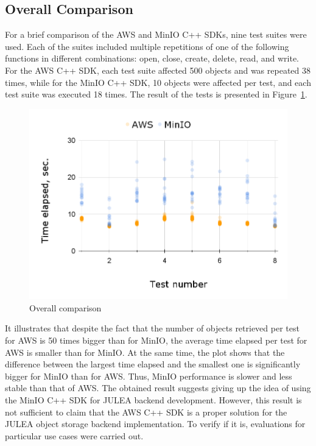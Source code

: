 \documentclass[conference]{IEEEtran}
\begin{document}
\subsection{Overall Comparison}
For a brief comparison of the AWS and MinIO C++ SDKs, nine test suites were used. Each of the suites included multiple repetitions of one of the following functions in different combinations: open, close, create, delete, read, and write. For the AWS C++ SDK, each test suite affected 500 objects and was repeated 38 times, while for the MinIO C++ SDK, 10 objects were affected per test, and each test suite was executed 18 times. The result of the tests is presented in Figure~\ref{fig:overall-comparison}. 
\begin{figure}
    \centering
    \includegraphics[width=0.9\linewidth]{overall_comparison.png}
    \caption{Overall comparison}
    \label{fig:overall-comparison}
\end{figure}
It illustrates that despite the fact that the number of objects retrieved per test for AWS is 50 times bigger than for MinIO, the average time elapsed per test for AWS is smaller than for MinIO. At the same time, the plot shows that the difference between the largest time elapsed and the smallest one is significantly bigger for MinIO than for AWS. Thus, MinIO performance is slower and less stable than that of AWS. The obtained result suggests giving up the idea of using the MinIO C++ SDK for JULEA backend development. However, this result is not sufficient to claim that the AWS C++ SDK is a proper solution for the JULEA object storage backend implementation. To verify if it is, evaluations for particular use cases were carried out.
\end{document}
